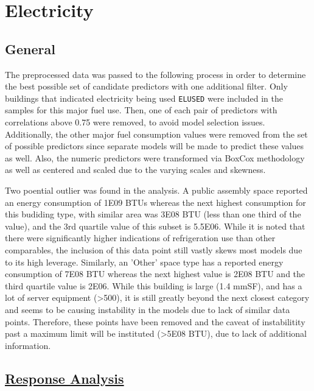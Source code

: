 \section*{Electricity}
\label{sec:electricity}

\subsection{General}

The preprocessed data was passed to the following process in order to determine the best possible set of candidate predictors with one additional filter.  Only buildings that indicated electricity being used \lstinline{ELUSED} were included in the samples for this major fuel use.  Then, one of each pair of predictors with correlations above 0.75 were removed, to avoid model selection issues. Additionally, the other major fuel consumption values were removed from the set of possible predictors since separate models will be made to predict these values as well.  Also, the numeric predictors were transformed via BoxCox methodology as well as centered and scaled due to the varying scales and skewness.

Two poential outlier was found in the analysis. A public assembly space reported an energy consumption of 1E09 BTUs whereas the next highest consumption for this budiding type, with similar area was  3E08 BTU (less than one third of the value), and the 3rd quartile value of this subset is 5.5E06.  While it is noted that there were significantly higher indications of refrigeration use than other comparables, the inclusion of this data point still vastly skews most models due to its high leverage.  Similarly, an 'Other' space type has a reported energy consumption of 7E08 BTU whereas the next highest value is 2E08 BTU and the third quartile value is 2E06.  While this building is large (1.4 mmSF), and has a lot of server equipment (>500), it is still greatly beyond the next closest category and seems to be causing instability in the models due to lack of similar data points.  Therefore, these points have been removed and the caveat of instabilitity past a maximum limit will be instituted (>5E08 BTU), due to lack of additional information.

\subsection{\hyperref[appendix:electricity:response]{Response Analysis}}

